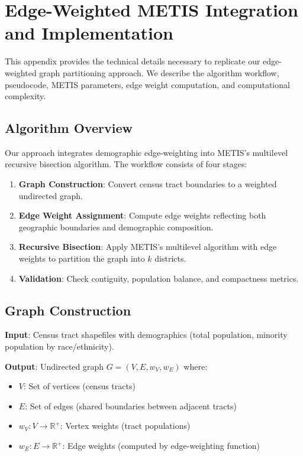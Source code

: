 
\section{Edge-Weighted METIS Integration and Implementation}
\label{appendix:implementation}

This appendix provides the technical details necessary to replicate our edge-weighted graph partitioning approach. We describe the algorithm workflow, pseudocode, METIS parameters, edge weight computation, and computational complexity.

\subsection{Algorithm Overview}

Our approach integrates demographic edge-weighting into METIS's multilevel recursive bisection algorithm. The workflow consists of four stages:

\begin{enumerate}
    \item \textbf{Graph Construction}: Convert census tract boundaries to a weighted undirected graph.
    \item \textbf{Edge Weight Assignment}: Compute edge weights reflecting both geographic boundaries and demographic composition.
    \item \textbf{Recursive Bisection}: Apply METIS's multilevel algorithm with edge weights to partition the graph into $k$ districts.
    \item \textbf{Validation}: Check contiguity, population balance, and compactness metrics.
\end{enumerate}

\subsection{Graph Construction}

\textbf{Input}: Census tract shapefiles with demographics (total population, minority population by race/ethnicity).

\textbf{Output}: Undirected graph $G = (V, E, w_V, w_E)$ where:
\begin{itemize}
    \item $V$: Set of vertices (census tracts)
    \item $E$: Set of edges (shared boundaries between adjacent tracts)
    \item $w_V: V \to \mathbb{R}^+$: Vertex weights (tract populations)
    \item $w_E: E \to \mathbb{R}^+$: Edge weights (computed by edge-weighting function)
\end{itemize}

